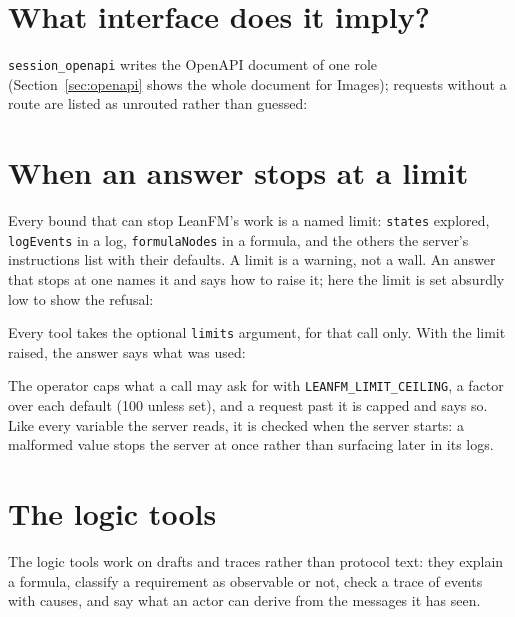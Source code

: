 
\section{What interface does it imply?}

\texttt{session\_openapi} writes the OpenAPI document of one role
(Section~\ref{sec:openapi} shows the whole document for Images); requests without a
route are listed as unrouted rather than guessed:


\section{When an answer stops at a limit}

Every bound that can stop LeanFM's work is a named limit: \texttt{states} explored,
\texttt{logEvents} in a log, \texttt{formulaNodes} in a formula, and the others the
server's instructions list with their defaults. A limit is a warning, not a wall. An
answer that stops at one names it and says how to raise it; here the limit is set
absurdly low to show the refusal:


Every tool takes the optional \texttt{limits} argument, for that call only. With the
limit raised, the answer says what was used:


The operator caps what a call may ask for with \texttt{LEANFM\_LIMIT\_CEILING}, a
factor over each default (100 unless set), and a request past it is capped and says
so. Like every variable the server reads, it is checked when the server starts: a
malformed value stops the server at once rather than surfacing later in its logs.

\section{The logic tools}

The logic tools work on drafts and traces rather than protocol text: they explain a
formula, classify a requirement as observable or not, check a trace of events with
causes, and say what an actor can derive from the messages it has seen.


